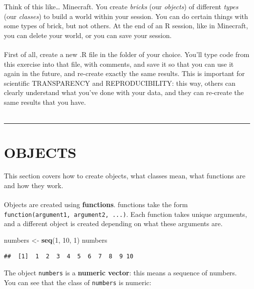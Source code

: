 \documentclass[
]{book}
\newenvironment{Shaded}{\begin{snugshade}}{\end{snugshade}}
\newcommand{\DecValTok}[1]{\textcolor[rgb]{0.00,0.00,0.81}{#1}}
\newcommand{\KeywordTok}[1]{\textcolor[rgb]{0.13,0.29,0.53}{\textbf{#1}}}
\newcommand{\NormalTok}[1]{#1}
\newcommand{\StringTok}[1]{\textcolor[rgb]{0.31,0.60,0.02}{#1}}
\begin{document}
Think of this like\ldots{} Minecraft. You create \emph{bricks} (our \emph{objects})
of different \emph{types} (our \emph{classes}) to build a world within your session. You
can do certain things with some types of brick, but not others. At the
end of an R session, like in Minecraft, you can delete your world, or you can
save your session.\\
~\\

First of all, create a new .R file in the folder of your choice. You'll type
code from this exercise into that file, with comments, and save it so that
you can use it again in the future, and re-create exactly the same results.
This is important for scientific TRANSPARENCY and REPRODUCIBILITY: this
way, others can clearly understand what you've done with your data, and
they can re-create the same results that you have.\\
~\\

\begin{center}\rule{0.5\linewidth}{0.5pt}\end{center}

\hypertarget{objects}{%
\section{OBJECTS}\label{objects}}

This section covers how to create objects, what classes mean, what functions
are and how they work.\\
~\\

Objects are created using \textbf{functions}. functions take the form
\texttt{function(argument1,\ argument2,\ ...)}. Each function takes unique arguments,
and a different object is created depending on what these arguments are.

\begin{Shaded}
\begin{Highlighting}[]
\NormalTok{numbers <-}\StringTok{ }\KeywordTok{seq}\NormalTok{(}\DecValTok{1}\NormalTok{, }\DecValTok{10}\NormalTok{, }\DecValTok{1}\NormalTok{)}
\NormalTok{numbers}
\end{Highlighting}
\end{Shaded}

\begin{verbatim}
##  [1]  1  2  3  4  5  6  7  8  9 10
\end{verbatim}

The object \texttt{numbers} is a \textbf{numeric vector}: this means a sequence of
numbers. You can see that the class of \texttt{numbers} is numeric:
\end{document}

